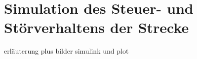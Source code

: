 
\newpage


\section{Simulation des Steuer- und Störverhaltens der Strecke}

erläuterung plus bilder simulink und plot